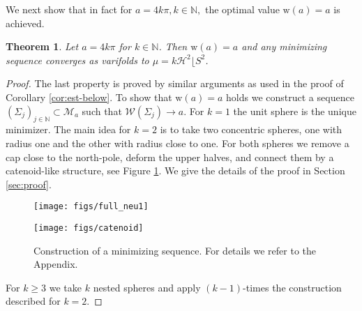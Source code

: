 \documentclass[reqno,makeidx,12pt]{amsart}
\theoremstyle{note}
\newtheorem{theorem}{Theorem}
\theoremstyle{definition}
\begin{document}
We next show that in fact for $a= 4k\pi, k\in{\ensuremath{\mathbb{N}}},$ the optimal value ${\text{w}}(a)=a$ is achieved.
\begin{theorem}\label{thm:m-sphere}
Let $a=4k\pi$ for $k\in{\ensuremath{\mathbb{N}}}$. Then ${\text{w}}(a)=a$ and any minimizing
sequence converges as varifolds to $\mu=k{\ensuremath{\mathcal{H}}}^2\lfloor S^2$.
\end{theorem}
\begin{proof}
The last property is proved by similar arguments as used in the proof of
Corollary \ref{cor:est-below}. To show that ${\text{w}}(a)=a$ holds we
construct a  sequence $(\Sigma_j)_{j\in{\ensuremath{\mathbb{N}}}}\subset {\mathcal{M}}_a$ such that
${\mathcal{W}}(\Sigma_j)\to a$. For $k=1$ the unit sphere is the unique minimizer.
The main idea for $k=2$ is to take two concentric spheres, one with
radius one and the 
other with radius close to one. For both spheres we remove a cap close to
the north-pole, deform the upper halves, and connect them by a catenoid-like
structure, see Figure \ref{fig:const1}.  We give the details of the
proof in Section \ref{sec:proof}.
\begin{figure}[h]
\begin{minipage}{\textwidth}
\begin{center}
  \begin{minipage}[b]{.4\linewidth} 
  \texttt{[image: figs/full\_neu1]}
  \end{minipage}
  \hspace{.1\linewidth}
  \begin{minipage}[b]{.4\linewidth} 
  \texttt{[image: figs/catenoid]}
  \end{minipage}
\end{center}
  \caption{Construction of a minimizing sequence. For details we refer to the Appendix.}
  \label{fig:const1}
\end{minipage}
\end{figure}

For $k\geq 3$ we take $k$ nested spheres and apply $(k-1)$-times the
construction described for $k=2$. 
\end{proof}
\end{document}
